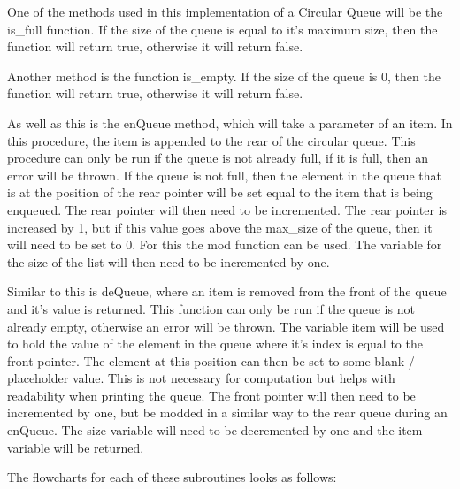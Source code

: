 \documentclass[12pt]{article}
\begin{document}
One of the methods used in this implementation of a Circular Queue will be the is\_full function. If the size of the queue is equal to it's maximum size, then the function will return true, otherwise it will return false.

Another method is the function is\_empty. If the size of the queue is 0, then the function will return true, otherwise it will return false.

As well as this is the enQueue method, which will take a parameter of an item. In this procedure, the item is appended to the rear of the circular queue. This procedure can only be run if the queue is not already full, if it is full, then an error will be thrown. If the queue is not full, then the element in the queue that is at the position of the rear pointer will be set equal to the item that is being enqueued. The rear pointer will then need to be incremented. The rear pointer is increased by 1, but if this value goes above the max\_size of the queue, then it will need to be set to 0. For this the mod function can be used. The variable for the size of the list will then need to be incremented by one.

Similar to this is deQueue, where an item is removed from the front of the queue and it's value is returned. This function can only be run if the queue is not already empty, otherwise an error will be thrown. The variable item will be used to hold the value of the element in the queue where it's index is equal to the front pointer. The element at this position can then be set to some blank / placeholder value. This is not necessary for computation but helps with readability when printing the queue. The front pointer will then need to be incremented by one, but be modded in a similar way to the rear queue during an enQueue. The size variable will need to be decremented by one and the item variable will be returned.

The flowcharts for each of these subroutines looks as follows:
\end{document}
